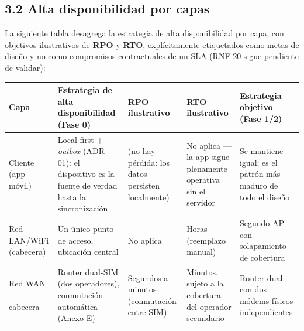\documentclass[11pt,a4paper]{article}
\begin{document}
\subsection{3.2 Alta disponibilidad por capas}\label{alta-disponibilidad-por-capas}

La siguiente tabla desagrega la estrategia de alta disponibilidad por capa, con objetivos ilustrativos de \textbf{RPO} y \textbf{RTO}, explícitamente etiquetados como metas de diseño y no como compromisos contractuales de un SLA (RNF-20 sigue pendiente de validar):

{\small
\begin{longtable}[]{@{}
  >{\raggedright\arraybackslash}p{}
  >{\raggedright\arraybackslash}p{}
  >{\raggedright\arraybackslash}p{}
  >{\raggedright\arraybackslash}p{}
  >{\raggedright\arraybackslash}p{}@{}}
\toprule\noalign{}
\begin{minipage}[b]{\linewidth}\raggedright
Capa
\end{minipage} & \begin{minipage}[b]{\linewidth}\raggedright
Estrategia de alta disponibilidad (Fase 0)
\end{minipage} & \begin{minipage}[b]{\linewidth}\raggedright
RPO ilustrativo
\end{minipage} & \begin{minipage}[b]{\linewidth}\raggedright
RTO ilustrativo
\end{minipage} & \begin{minipage}[b]{\linewidth}\raggedright
Estrategia objetivo (Fase 1/2)
\end{minipage} \\
\midrule\noalign{}
\endhead
\bottomrule\noalign{}
\endlastfoot
Cliente (app móvil) & Local-first + \emph{outbox} (ADR-01): el dispositivo es la fuente de verdad hasta la sincronización & 0 (no hay pérdida: los datos persisten localmente) & No aplica --- la app sigue plenamente operativa sin el servidor & Se mantiene igual; es el patrón más maduro de todo el diseño \\
Red LAN/WiFi (cabecera) & Un único punto de acceso, ubicación central & No aplica & Horas (reemplazo manual) & Segundo AP con solapamiento de cobertura \\
Red WAN --- cabecera & Router dual-SIM (dos operadores), conmutación automática (Anexo E) & Segundos a minutos (conmutación entre SIM) & Minutos, sujeto a la cobertura del operador secundario & Router dual con dos módems físicos independientes \\

\end{longtable}}
\end{document}
